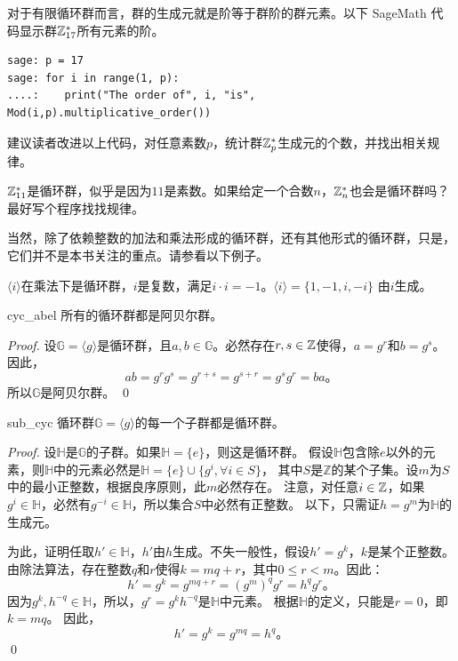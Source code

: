 \begin{example}
	对于有限循环群而言，群的生成元就是阶等于群阶的群元素。以下 SageMath 代码显示群${\mathbb Z}_{17}^*$所有元素的阶。
\begin{lstlisting}
sage: p = 17
sage: for i in range(1, p):
....:    print("The order of", i, "is", Mod(i,p).multiplicative_order())
\end{lstlisting}
建议读者改进以上代码，对任意素数$p$，统计群${\mathbb Z}_p^*$生成元的个数，并找出相关规律。
\end{example}

\begin{example}
${\mathbb Z}_{11}^*$是循环群，似乎是因为$11$是素数。如果给定一个合数$n$，${\mathbb Z}_n^*$也会是循环群吗？最好写个程序找找规律。
\end{example}

当然，除了依赖整数的加法和乘法形成的循环群，还有其他形式的循环群，只是，它们并不是本书关注的重点。请参看以下例子。
\begin{example}
	$\langle i \rangle$在乘法下是循环群，$i$是复数，满足$i \cdot i = -1$。$\langle i \rangle =\{1, -1, i, -i\}$ 由$i$生成。
\end{example}

\begin{proposition}{}{cyc_abel}
所有的循环群都是阿贝尔群。
\end{proposition}

\begin{proof}
设$\mathbb{G} = \langle g \rangle$是循环群，且$a, b \in \mathbb{G}$。必然存在$r, s \in {\mathbb Z}$使得，$a = g^r$和$b = g^s$。
因此，
\[ a b = g^r g^s = g^{r + s} = g^{s + r} = g^s g^r = b a\text{。}\]
所以$\mathbb{G}$是阿贝尔群。 \qed
\end{proof}

\begin{proposition}{}{sub_cyc}
循环群$\mathbb{G}=\langle g \rangle$的每一个子群都是循环群。
\end{proposition}
\begin{proof}
设$\mathbb{H}$是$\mathbb{G}$的子群。如果$\mathbb{H} = \{ e \}$，则这是循环群。
假设$\mathbb{H}$包含除$e$以外的元素，则$\mathbb{H}$中的元素必然是$\mathbb{H} = \{e\} \cup \{ g^i, \forall i \in S \}$，
其中$S$是$\mathbb{Z}$的某个子集。设$m$为$S$中的最小正整数，根据良序原则，此$m$必然存在。
注意，对任意$i \in {\mathbb Z}$，如果$g^i \in \mathbb{H}$，必然有$g^{-i} \in \mathbb{H}$，所以集合$S$中必然有正整数。
以下，只需证$h = g^m$为$\mathbb{H}$的生成元。

为此，证明任取$h' \in \mathbb{H}$，$h'$由$h$生成。不失一般性，假设$h' = g^k$，$k$是某个正整数。
由除法算法，存在整数$q$和$r$使得$k = mq + r$，其中$0 \leq r < m$。因此：
\[h'= g^k = g^{mq + r} = (g^m)^q g^r = h^q g^r\text{。}\]
因为$g^k, h^{-q} \in \mathbb{H}$，所以，$g^r = g^k h^{-q}$是$\mathbb{H}$中元素。
根据$\mathbb{H}$的定义，只能是$r = 0$，即$k = mq$。
因此，
\[h'= g^k = g^{mq} = h^q\text{。}\] \qed
\end{proof}


